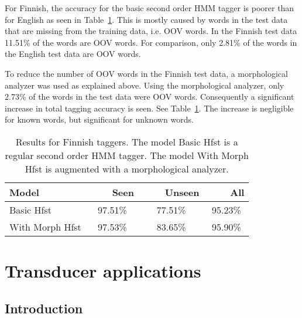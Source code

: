\documentclass{llncs}
\begin{document}
For Finnish, the accuracy for the basic second order HMM tagger is
poorer than for English as seen in Table~\ref{fin-tagging-acc}. This
is mostly caused by words in the test data that are
missing from the training data, i.e. OOV words. In the Finnish test
data 11.51\% of the words are OOV words. For comparison, only 2.81\%
of the words in the English test data are OOV words.

To reduce the number of OOV words in the Finnish test data, a
morphological analyzer was used as explained above. Using the
morphological analyzer, only 2.73\% of the words in the test data
were OOV words. Consequently a significant increase in total tagging
accuracy is seen. See Table~\ref{fin-tagging-acc}. The increase is
negligible for known words, but significant for unknown words.

\begin{table}
  \caption{Results for Finnish taggers. The model Basic Hfst is a
    regular second order HMM tagger. The model With Morph Hfst is
    augmented with a morphological analyzer.}\label{fin-tagging-acc}
  \begin{center}
    \begin{tabular}{lccc}
      \hline 
      Model            & ~~~~Seen & ~~~~Unseen & ~~~~All \\
      \hline 
      Basic Hfst       &  97.51\% &    77.51\% & 95.23\% \\
      With Morph Hfst  &  97.53\% &    83.65\% & 95.90\% \\
      \hline
    \end{tabular}
  \end{center}
\end{table}


\section{Transducer applications}\label{Applications}

\subsection{Introduction}
\end{document}
